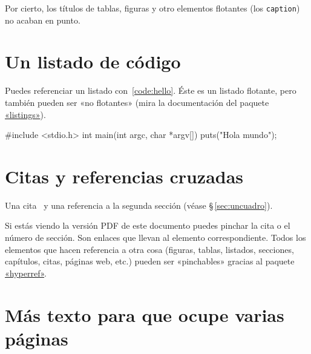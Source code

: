 Por cierto, los títulos de tablas, figuras y otro elementos flotantes (los
\texttt{caption}) no acaban en punto.


\section{Un listado de código}
\label{sec:listado}

Puedes referenciar un listado con~\ref{code:hello}. Éste es un listado flotante,
pero también pueden ser «no flotantes» (mira la documentación del paquete
\href{http://www.ctan.org/get/macros/latex/contrib/listings/listings.pdf}{«listings»}).

\begin{listing}[
  float,
  language = C,
  caption  = {Hola mundo en C},
  label    = code:hello]
#include <stdio.h>
int main(int argc, char *argv[]) {
    puts("Hola mundo\n");
}
\end{listing}




\section{Citas y referencias cruzadas}

Una cita~\cite{design_patterns} y una referencia a la segunda sección (véase
\S\,\ref{sec:uncuadro}).

Si estás viendo la versión PDF de este documento puedes pinchar la cita o el
número de sección. Son enlaces que llevan al elemento correspondiente. Todos los
elementos que hacen referencia a otra cosa (figuras, tablas, listados,
secciones, capítulos, citas, páginas web, etc.) pueden ser «pinchables» gracias al
paquete \href{http://latex.tugraz.at/_media/docs/hyperref.pdf}{«hyperref»}.



\section{Más texto para que ocupe varias páginas}





